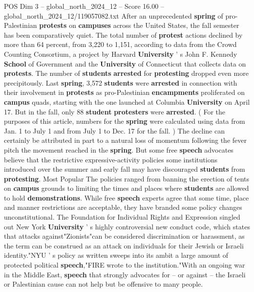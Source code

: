 \begin{textsample}{POS Dim 3 – global\_north\_2024\_12 – Score 16.00 – global\_north\_2024\_12/119057082.txt}  \label{ex:f3_pos_212}
After an unprecedented \textbf{spring} of pro-Palestinian \textbf{protests} on \textbf{campuses} across the United States, the fall semester has been comparatively quiet.
The total number of \textbf{protest} actions declined by more than 64 percent, from 3,220 to 1,151, according to data from the Crowd Counting Consortium, a project by Harvard \textbf{University} ' s John F.
Kennedy \textbf{School} of Government and the \textbf{University} of Connecticut that collects data on \textbf{protests}.
The number of \textbf{students} \textbf{arrested} for \textbf{protesting} dropped even more precipitously.
Last \textbf{spring}, 3,572 \textbf{students} were \textbf{arrested} in connection with their involvement in \textbf{protests} as pro-Palestinian \textbf{encampments} proliferated on \textbf{campus} quads, starting with the one launched at Columbia \textbf{University} on April 17.
But in the fall, only 88 \textbf{student} \textbf{protesters} were \textbf{arrested}. ( For the purposes of this article, numbers for the \textbf{spring} were calculated using data from Jan. 1 to July 1 and from July 1 to Dec. 17 for the fall. ) The decline can certainly be attributed in part to a natural loss of momentum following the fever pitch the movement reached in the \textbf{spring}.
But some free \textbf{speech} advocates believe that the restrictive expressive-activity policies some institutions introduced over the summer and early fall may have discouraged \textbf{students} from \textbf{protesting}.
Most Popular The policies ranged from banning the erection of tents on \textbf{campus} grounds to limiting the times and places where \textbf{students} are allowed to hold \textbf{demonstrations}.
While free \textbf{speech} experts agree that some time, place and manner restrictions are acceptable, they have branded some policy changes unconstitutional.
The Foundation for Individual Rights and Expression singled out New York \textbf{University} ' s highly controversial new conduct code, which states that attacks against"Zionists"can be considered discrimination or harassment, as the term can be construed as an attack on individuals for their Jewish or Israeli identity."NYU ' s policy as written sweeps into its ambit a large amount of protected political \textbf{speech},"FIRE wrote to the institution."With an ongoing war in the Middle East, \textbf{speech} that strongly advocates for -- or against -- the Israeli or Palestinian cause can not help but be offensive to many people.

\end{textsample}
